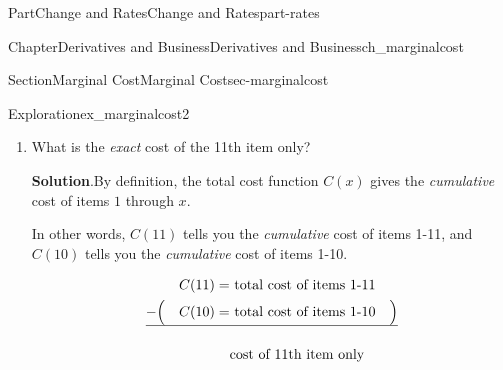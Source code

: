 \documentclass{tufte-book}
\newcommand{\blocktitlefont}{\relax}
\newcommand{\xreffont}{\relax}
\numberwithin{equation}{chapter}
\newcommand{\ddx}[1]{ \dfrac{d}{dx} \Big[ #1 \Big]  }
\newcommand{\amp}{&}
\begin{document}
\begin{partptx}{Part}{Change and Rates}{}{Change and Rates}{}{}{part-rates}
\begin{chapterptx}{Chapter}{Derivatives and Business}{}{Derivatives and Business}{}{}{ch_marginalcost}
\begin{sectionptx}{Section}{Marginal Cost}{}{Marginal Cost}{}{}{sec-marginalcost}
\begin{exploration}{Exploration}{}{ex_marginalcost2}
\begin{enumerate}[font=\bfseries,label=(\alph*),ref=\alph*]
\par\smallskip%
\noindent\textbf{\blocktitlefont Solution}.\hypertarget{ex_marginalcost2-2-2}{}\quad{}By \hyperref[defn_marginalcost]{Definition~{\xreffont\ref{defn_marginalcost}}}, when we are asked to \emph{approximate} the cost of the next item, we must find and use the marginal cost function.%
\par
To find the marginal cost function, use the derivative shortcuts%
\begin{align*}
C'(x) = \amp \ddx{ 120 + 5x - 0.1x^2 }\\
= \amp \ddx{120} + \ddx{5x} - \ddx{0.1x^2}\\
= \amp 0 + 5 - 0.1\cdot \ddx{x^2}\\
= \amp 5 - 0.1\cdot 2x\\
= \amp 5 - 0.2x
\end{align*}
%
\par
To use the marginal cost function, recall that%
\begin{equation*}
C'(x) = \text{ the APPROXIMATE cost of the NEXT item in \$/item }
\end{equation*}
We want to find the approximate cost of the 11th item. Item 11 is the item that is \emph{immediately after item 10}.%
\par
In other words, compute \(C'(10)\). That will tell us the approximate cost of the item \emph{after} 10, which is the 11th item.%
\begin{equation*}
C'(10) = 5 - 0.2\cdot 10 = 3
\end{equation*}
The 11th item will cost approximately 3\textdollar{}.%
\item{}What is the \emph{exact} cost of the 11th item only?%
\par\smallskip%
\noindent\textbf{\blocktitlefont Solution}.\hypertarget{ex_marginalcost2-3-2}{}\quad{}By definition, the total cost function \(C(x)\) gives the \emph{cumulative} cost of items \(1\) through \(x\).%
\par
In other words, \(C(11)\) tells you the \emph{cumulative} cost of items 1-11, and \(C(10)\) tells you the \emph{cumulative} cost of items 1-10.%
\par
%
\begin{align*}
\amp\amp C(11) = \amp \text{ total cost of items 1-11}  \amp \\
-\amp\Big(\amp C(10) = \amp \text{ total cost of items 1-10} \amp \Big) \\
\hline \\
\amp \amp \amp \text{cost of 11th item only} \amp 

\end{align*}
\end{enumerate}
\end{exploration}
\end{sectionptx}
\end{chapterptx}
\end{partptx}
\end{document}
